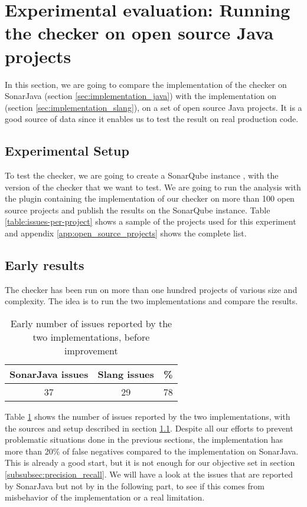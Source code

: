 \section{Experimental evaluation: \newline Running the checker on open source Java projects}
\label{sec:running_checker}

In this section, we are going to compare the implementation of the checker on SonarJava (section \ref{sec:implementation_java}) with the implementation on \slang{} (section \ref{sec:implementation_slang}), on a set of open source Java projects. 
It is a good source of data since it enables us to test the result on real production code.

\subsection{Experimental Setup}
\label{subsec:experimental_setup}

To test the checker, we are going to create a SonarQube instance \cite{SonarQube:2019:Online}, with the version of the checker that we want to test. We are going to run the analysis with the plugin containing the implementation of our checker on more than 100 open source projects and publish the results on the SonarQube instance. Table \ref{table:issues-per-project} shows a sample of the projects used for this experiment and appendix \ref{app:open_source_projects} shows the complete list.

\subsection{Early results}
\label{subsec:early_results}

The checker has been run on more than one hundred projects of various size and complexity. 
The idea is to run the two implementations and compare the results.

\begin{table}[h]
	\centering
	\caption{Early number of issues reported by the two implementations, before improvement}
	\label{table:early-sonarjava-vs-slang}
	\begin{tabular}{|c|c|c|}
		\hline
		\bf SonarJava issues & \bf Slang issues & \bf \% \\ \hline
		37 &  29 &  78 \\ \hline
	\end{tabular}
\end{table}


Table \ref{table:early-sonarjava-vs-slang} shows the number of issues reported by the two implementations, with the sources and setup described in section \ref{subsec:experimental_setup}. 
Despite all our efforts to prevent problematic situations done in the previous sections, the implementation has more than 20\% of false negatives compared to the implementation on SonarJava. 
This is already a good start, but it is not enough for our objective set in section \ref{subsubsec:precision_recall}.
We will have a look at the issues that are reported by SonarJava but not by \slang{} in the following part, to see if this comes from misbehavior of the implementation or a real limitation.

